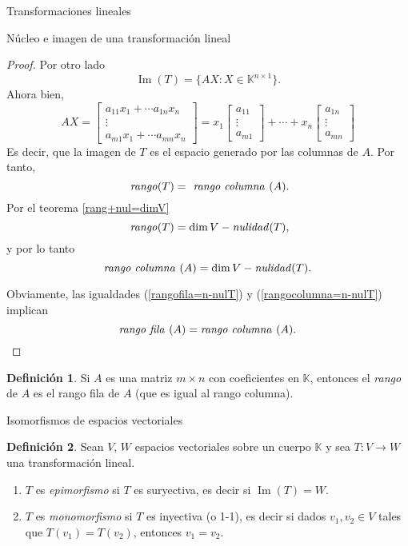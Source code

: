 \documentclass[a4paper,12pt,twoside,spanish,reqno]{amsbook}
\theoremstyle{definition}
\newtheorem{definicion}{Definici\'on}[section]
\theoremstyle{remark}
\newcommand{\img}{\operatorname{Im}}
\newcommand{\K}{\mathbb K}
\begin{document}
\begin{chapter}{Transformaciones lineales}
\begin{section}{Núcleo e imagen de una transformación lineal}
\begin{proof}
			Por otro lado 
			$$
			\img(T) = \{AX: X \in \K^{n \times 1} \}.
			$$
			Ahora bien, 
			$$
			AX = 
			\begin{bmatrix} a_{11} x_1 +\cdots a_{1n} x_n \\ \vdots \\ a_{m1} x_1 +\cdots a_{mn} x_n  \end{bmatrix}
			= 
			x_1\begin{bmatrix} a_{11} \\ \vdots \\ a_{m1} \end{bmatrix} + \cdots +
			x_n\begin{bmatrix}  a_{1n}  \\ \vdots \\ a_{mn}  \end{bmatrix}
			$$
			Es decir, que la imagen de $T$ es el espacio generado por las columnas de $A$. Por tanto,
			$$
			\text{\textit{ rango}}(T) =\text{\textit{ rango  columna }}(A).
			$$
			Por  el  teorema \ref{rang+nul=dimV}
			$$
			\text{\textit{ rango}}(T) = \dim V - \text{\textit{nulidad}}(T),
			$$
			y por lo tanto
			\begin{equation}\label{rangocolumna=n-nulT}
			\text{\textit{rango columna }} (A) = \dim V - \text{\textit{nulidad}}(T). 
			\end{equation}
			
			Obviamente, las igualdades (\ref{rangofila=n-nulT}) y (\ref{rangocolumna=n-nulT}) implican 
			$$
		\text{\textit{rango fila }} (A) = \text{\textit{rango  columna }} (A).
		$$
		\end{proof}
	
		\begin{definicion}
				Si $A$ es una matriz $m \times n$ con coeficientes  en $\K$,  entonces el \textit{rango} de $A$ es el rango fila de $A$ (que es igual al rango columna).
		\end{definicion}
		
		\end{section}
	
		\begin{section}{Isomorfismos de espacios vectoriales}
		
		\begin{definicion}
			Sean $V$, $W$ espacios vectoriales sobre un cuerpo $\K$ y sea $T:V \to W$ una transformación lineal.
			\begin{enumerate}
				\item $T$  es \textit{epimorfismo} si $T$ es suryectiva, es decir si $\img(T) = W$.
				\item $T$ es \textit{monomorfismo} si $T$ es inyectiva (o 1-1),  es decir si dados $v_1,v_2 \in V$ tales que $T(v_1) = T(v_2)$,  entonces $v_1 = v_2$.
			\end{enumerate}  
		\end{definicion}
	

\end{section}
\end{chapter}
\end{document}
